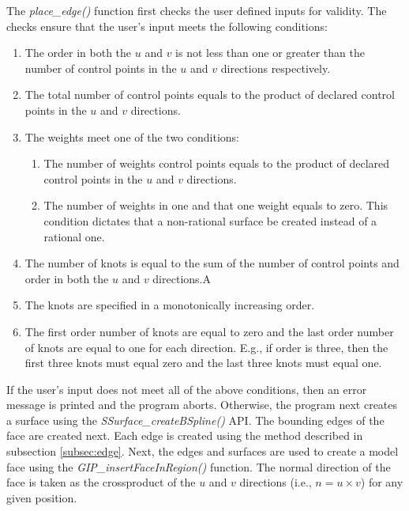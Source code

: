 \documentclass[a4paper, 12pt]{article}
\begin{document}
The \emph{place\_edge()} function first checks the user defined inputs
for validity. The checks ensure that the user's input meets the 
following conditions:
\begin{enumerate}
  \item The order in both the $u$ and $v$ is not less than one or greater than
      the number of control points in the $u$ and $v$ directions respectively. 
  \item The total number of control points equals to the product of 
      declared control points in the $u$ and $v$ directions.
  \item The weights meet one of the two conditions:
  \begin{enumerate}
    \item The number of weights control points equals to the product of 
        declared control points in the $u$ and $v$ directions.
    \item The number of weights in one and that one weight equals to zero. 
        This condition dictates that a non-rational surface be created 
        instead of a rational one.
  \end{enumerate}
  \item The number of knots is equal to the sum of the number of control points
      and order in both the $u$ and $v$ directions.A
  \item The knots are specified in a monotonically increasing order. 
  \item The first order number of knots are equal to zero and the last order number 
      of knots are equal to one for each direction. 
      E.g., if order is three, then the first three
      knots must equal zero and the last three knots must equal one.
\end{enumerate}

If the user's input does not meet all of the above conditions, then
an error message is printed and the program aborts. Otherwise, 
the program next creates a surface using the \emph{SSurface\_createBSpline()} 
API. The bounding edges of the face are created next. 
Each edge is created using the method described in 
subsection \ref{subsec:edge}. Next, the edges and surfaces are used to 
create a model face using the \emph{GIP\_insertFaceInRegion()} function. 
The normal direction of the face is taken as the crossproduct of 
the $u$ and $v$ directions (i.e., $n=u\times v$) for any given position. 
\end{document}
